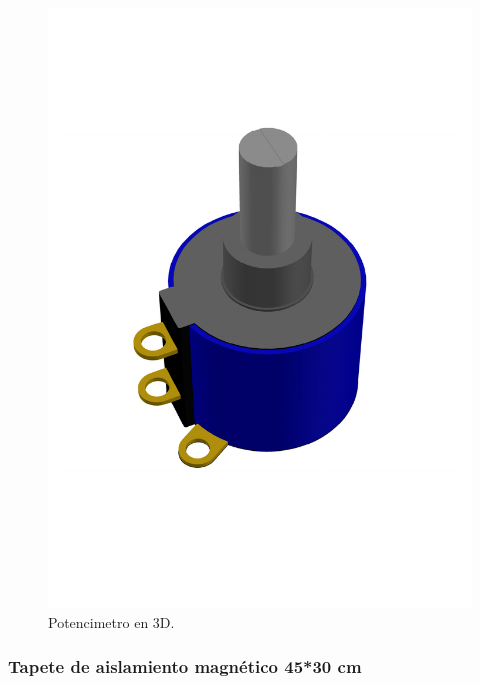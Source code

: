     \begin{figure}[H]
        \centering
        \includegraphics[scale=0.4]{15/img/potenciometroModelo.pdf}
        \caption{Potencimetro en 3D.}
        \label{fig:potenciometroModelo}
    \end{figure}
    
    \subsubsection{Tapete de aislamiento magnético 45*30 cm}
    
    
    
    
